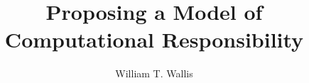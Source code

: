



\title{Proposing a Model of Computational Responsibility}
\author{William T. Wallis}
\date{}
\maketitle

\tableofcontents
\newpage















